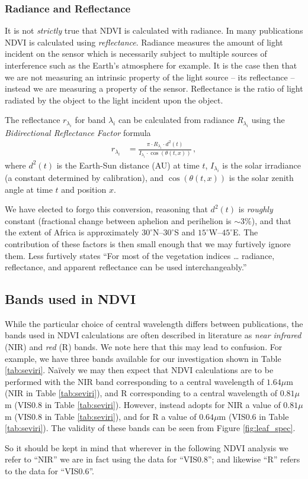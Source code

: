 \subsubsection{Radiance and Reflectance}

It is not \emph{strictly} true that NDVI is calculated with
radiance. In many publications NDVI is calculated using
\emph{reflectance}. Radiance measures the amount of light incident on
the sensor which is necessarily subject to multiple sources of
interference such as the Earth's atmosphere for example. It is the
case then that we are not measuring an intrinsic property of the light
source -- its reflectance -- instead we are measuring a property of the
sensor. Reflectance is the ratio of light radiated by the object to
the light incident upon the object.

The reflectance $r_{\lambda_i}$ for band $\lambda_i$ can be calculated from
radiance $R_{\lambda_i}$ using the \emph{Bidirectional Reflectance Factor}
formula \citep{msgbdrf2012}
\begin{align}
  r_{\lambda_i} &= \frac{\pi \cdot R_{\lambda_i} \cdot d^2\left(t\right)} {I_{\lambda_i} \cdot
    \cos\left(\theta\left(t, x\right)\right)} \,,
\end{align}
where $d^2\left(t\right)$ is the Earth-Sun distance (AU) at time $t$,
$I_{\lambda_i}$ is the solar irradiance (a constant determined by
calibration), and $\cos\left(\theta\left(t, x\right)\right)$ is the solar
zenith angle at time $t$ and position $x$.

We have elected to forgo this conversion, reasoning that
$d^2\left(t\right)$ is \emph{roughly} constant (fractional change
between aphelion and perihelion is ${\sim}3\%$), and that the extent of
Africa is approximately $30^{\circ}$N--$30^{\circ}$S and
$15^{\circ}$W--$45^{\circ}$E. The contribution of these factors is then small
enough that we may furtively ignore them. Less furtively
\cite{ray1994} states ``For most of the vegetation indices {\dots}
radiance, reflectance, and apparent reflectance can be used
interchangeably.''

\subsection{Bands used in NDVI}
\label{sec:ndvi_bands}

While the particular choice of central wavelength differs between
publications, the bands used in NDVI calculations are often described
in literature as \emph{near infrared} (NIR) and \emph{red} (R)
bands. We note here that this may lead to confusion. For example, we
have three bands available for our investigation shown in Table
\ref{tab:seviri}. Na{\"i}vely we may then expect that NDVI
calculations are to be performed with the NIR band corresponding to a
central wavelength of $1.64\mu$m (NIR in Table \ref{tab:seviri}), and R
corresponding to a central wavelength of $0.81\mu$m (VIS0.8 in Table
\ref{tab:seviri}). However, \cite{msgndvi2015} instead adopts for NIR
a value of $0.81\mu$m (VIS0.8 in Table \ref{tab:seviri}), and for R a
value of $0.64\mu$m (VIS0.6 in Table \ref{tab:seviri}). The validity of these bands can be seen from Figure \ref{fig:leaf_spec}.

So it should be kept in mind that wherever in the following NDVI
analysis we refer to ``NIR'' we are in fact using the data for
``VIS0.8''; and likewise ``R'' refers to the data for ``VIS0.6''.

